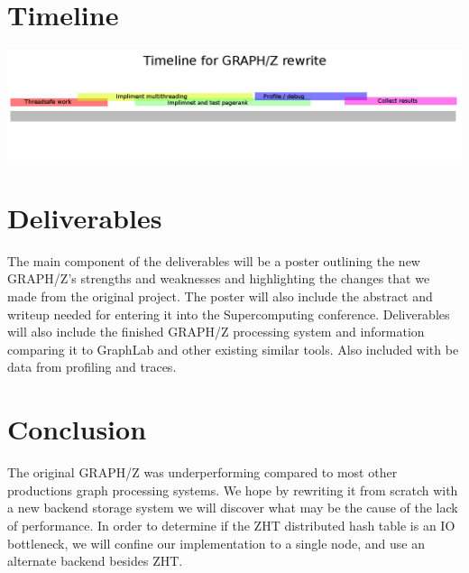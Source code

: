 \documentclass[10pt]{article}
\begin{document}
  \section{Timeline}
  \includegraphics[width=\textwidth]{timeline.png}
\begin{multicols}{2}
  \section{Deliverables}
   The main component of the deliverables will be a poster outlining the new GRAPH/Z's strengths and weaknesses and highlighting the changes that we made from the original project. The poster will also include the abstract and writeup needed for entering it into the Supercomputing conference.  Deliverables will also include the finished GRAPH/Z processing system and information comparing it to GraphLab and other existing similar tools. Also included with be data from profiling and traces. 
   \section{Conclusion}
   The original GRAPH/Z was underperforming compared to most other productions graph processing systems. We hope by rewriting it from scratch with a new backend storage system we will discover what may be the cause of the lack of performance. In order to determine if the ZHT distributed hash table is an IO bottleneck, we will confine our implementation to a single node, and use an alternate backend besides ZHT. 
\end{multicols}
\end{document}
